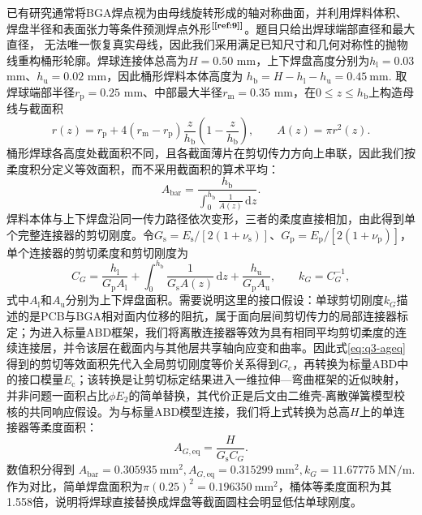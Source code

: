 \documentclass[draft,12pt,a4paper]{ctexart}
\theoremstyle{definition}
\newcommand{\diff}{\mathrm{d}}
\begin{document}
已有研究通常将BGA焊点视为由母线旋转形成的轴对称曲面，并利用焊料体积、焊盘半径和表面张力等条件预测焊点外形$^{\textbf{[\ref{ref:9}]}}$。题目只给出焊球端部直径和最大直径，
无法唯一恢复真实母线，因此我们采用满足已知尺寸和几何对称性的抛物线重构桶形轮廓。焊球连接体总高为$H=0.50$ mm，上下焊盘高度分别为$h_{\mathrm l}=0.03$ mm、$h_{\mathrm u}=0.02$ mm，因此桶形焊料本体高度为
$
h_{\mathrm b}=H-h_{\mathrm l}-h_{\mathrm u}=0.45\ \mathrm{mm}.
$
取焊球端部半径$r_{\mathrm p}=0.25$ mm、中部最大半径$r_{\mathrm m}=0.35$ mm，在$0\le z\le h_{\mathrm b}$上构造母线与截面积
\begin{equation}\label{eq:q3-rz}
r(z)=r_{\mathrm p}+
4(r_{\mathrm m}-r_{\mathrm p})\frac{z}{h_{\mathrm b}}
\left(1-\frac{z}{h_{\mathrm b}}\right),
\qquad
A(z)=\pi r^2(z).
\end{equation}
桶形焊球各高度处截面积不同，且各截面薄片在剪切传力方向上串联，因此我们按柔度积分定义等效面积，而不采用截面积的算术平均：
\begin{equation}\label{eq:q3-abar}
A_{\mathrm{bar}}
=\frac{h_{\mathrm b}}
{\displaystyle\int_0^{h_{\mathrm b}}\frac{1}{A(z)}\,\diff z}.
\end{equation}
焊料本体与上下焊盘沿同一传力路径依次变形，三者的柔度直接相加，由此得到单个完整连接器的剪切刚度。令$G_{\mathrm s}=E_{\mathrm s}/[2(1+\nu_{\mathrm s})]$、$G_{\mathrm p}=E_{\mathrm p}/[2(1+\nu_{\mathrm p})]$，单个连接器的剪切柔度和剪切刚度为
\begin{equation}\label{eq:q3-cg}
C_G=\frac{h_{\mathrm l}}{G_{\mathrm p}A_{\mathrm l}}
+\int_0^{h_{\mathrm b}}\frac{1}{G_{\mathrm s}A(z)}\,\diff z
+\frac{h_{\mathrm u}}{G_{\mathrm p}A_{\mathrm u}},
\qquad
k_G=C_G^{-1},
\end{equation}
式中$A_{\mathrm l}$和$A_{\mathrm u}$分别为上下焊盘面积。需要说明这里的接口假设：单球剪切刚度$k_G$描述的是PCB与BGA相对面内位移的阻抗，属于面向层间剪切传力的局部连接器标定；为进入标量ABD框架，我们将离散连接器等效为具有相同平均剪切柔度的连续连接层，并令该层在截面内与其他层共享轴向应变和曲率。因此式\eqref{eq:q3-ageq}得到的剪切等效面积先代入全局剪切刚度等价关系得到$G_{\mathrm c}$，再转换为标量ABD中的接口模量$E_{\mathrm c}$；该转换是让剪切标定结果进入一维拉伸—弯曲框架的近似映射，并非问题一面积占比$\phi E_2$的简单替换，其代价正是后文由二维壳-离散弹簧模型校核的共同响应假设。为与标量ABD模型连接，我们将上式转换为总高$H$上的单连接器等柔度面积：
\begin{equation}\label{eq:q3-ageq}
A_{G,\mathrm{eq}}=\frac{H}{G_{\mathrm s}C_G}.
\end{equation}
数值积分得到
$
A_{\mathrm{bar}}=0.305935\ \mathrm{mm^2},
A_{G,\mathrm{eq}}=0.315299\ \mathrm{mm^2},
k_G=11.67775\ \mathrm{MN/m}.
$
作为对比，简单焊盘面积为$\pi(0.25)^2=0.196350\ \mathrm{mm^2}$，桶体等柔度面积为其1.558倍，说明将焊球直接替换成焊盘等截面圆柱会明显低估单球刚度。
\end{document}
